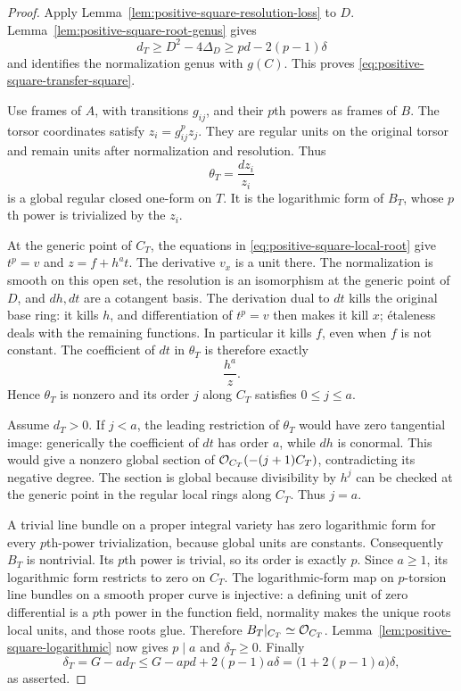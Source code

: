 \begin{proof}
Apply Lemma~\ref{lem:positive-square-resolution-loss} to $D$.
Lemma~\ref{lem:positive-square-root-genus} gives
\[
 d_T\geq D^2-4\Delta_D
       \geq pd-2(p-1)\delta
\]
and identifies the normalization genus with $g(C)$.
This proves \eqref{eq:positive-square-transfer-square}.

Use frames of $A$, with transitions $g_{ij}$, and their $p$th
powers as frames of $B$. The torsor coordinates satisfy
$z_i=g_{ij}^p z_j$. They are regular units on the original torsor
and remain units after normalization and resolution. Thus
\[
 \theta_T=\frac{dz_i}{z_i}
\]
is a global regular closed one-form on $T$. It is the logarithmic
form of $B_T$, whose $p$th power is trivialized by the $z_i$.

At the generic point of $C_T$, the equations in
\eqref{eq:positive-square-local-root} give
$t^p=v$ and $z=f+h^at$. The derivative $v_x$ is a unit there.
The normalization is smooth on this open set, the resolution is an
isomorphism at the generic point of $D$, and $dh,dt$ are a
cotangent basis. The derivation dual to $dt$ kills the original
base ring: it kills $h$, and differentiation of $t^p=v$ then makes
it kill $x$; \'etaleness deals with the remaining functions.
In particular it kills $f$, even when $f$ is not constant.
The coefficient of $dt$ in $\theta_T$ is therefore exactly
\begin{equation}\label{eq:positive-square-transfer-coefficient}
 \frac{h^a}{z}.
\end{equation}
Hence $\theta_T$ is nonzero and its order $j$ along $C_T$ satisfies
$0\leq j\leq a$.

Assume $d_T>0$. If $j<a$, the leading restriction of $\theta_T$
would have zero tangential image: generically the coefficient of
$dt$ has order $a$, while $dh$ is conormal. This would give a
nonzero global section of
$\mathcal O_{C_T}(-(j+1)C_T)$, contradicting its negative degree.
The section is global because divisibility by $h^j$ can be checked
at the generic point in the regular local rings along $C_T$.
Thus $j=a$.

A trivial line bundle on a proper integral variety has zero
logarithmic form for every $p$th-power trivialization, because
global units are constants. Consequently $B_T$ is nontrivial.
Its $p$th power is trivial, so its order is exactly $p$.
Since $a\geq1$, its logarithmic form restricts to zero on $C_T$.
The logarithmic-form map on $p$-torsion line bundles on a smooth
proper curve is injective: a defining unit of zero differential is
a $p$th power in the function field, normality makes the unique
roots local units, and those roots glue. Therefore
$B_T|_{C_T}\simeq\mathcal O_{C_T}$.
Lemma~\ref{lem:positive-square-logarithmic} now gives $p\mid a$
and $\delta_T\geq0$. Finally
\[
 \delta_T
 =G-a d_T
 \leq G-apd+2(p-1)a\delta
 =\bigl(1+2(p-1)a\bigr)\delta,
\]
as asserted.
\end{proof}

